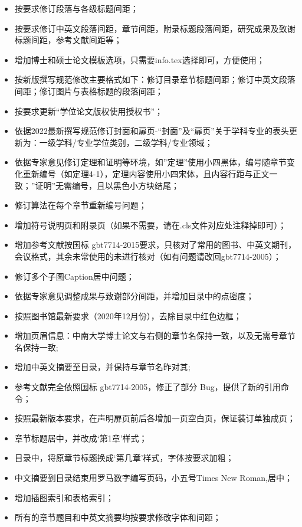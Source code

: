 \begin{itemize}
\item 按要求修订段落与各级标题间距；
\item 按要求修订中英文段落间距，章节间距，附录标题段落间距，研究成果及致谢标题间距，参考文献间距等；
\item 增加博士和硕士论文模板选项，只需要info.tex选择即可，方便使用；
\item 按新版撰写规范修改主要格式如下：修订目录章节标题间距；修订中英文段落间距；修订图片与表格标题的段落间距；
\item 按要求更新“学位论文版权使用授权书”；
\item 依据2022最新撰写规范修订封面和扉页-“封面”及“扉页”关于学科专业的表头更新为：一级学科/专业学位类别，二级学科/专业领域；
\item 依据专家意见修订定理和证明等环境，如”定理”使用小四黑体，编号随章节变化重新编号（如定理4-1），定理内容使用小四宋体，且内容行距与正文一致；”证明”无需编号，且以黑色小方块结尾；
\item 修订算法在每个章节重新编号问题；
\item 增加符号说明页和附录页（如果不需要，请在.cls文件对应处注释掉即可）；
\item  增加参考文献按国标 gbt7714-2015要求，只核对了常用的图书、中英文期刊，会议格式，其余未常使用的未进行核对（如有问题请改回gbt7714-2005）；
\item  修订多个子图Caption居中问题；
\item 依据专家意见调整成果与致谢部分间距，并增加目录中的点密度；
\item 按照图书馆最新要求（2020年12月份），去除目录中红色边框；
\item 增加页眉信息：中南大学博士论文与右侧的章节名保持一致，以及无需号章节名保持一致;
\item 增加中英文摘要至目录，并保持与章节名昨对其;
\item 参考文献完全依照国标 gbt7714-2005，修正了部分 Bug，提供了新的引用命令；
\item 按照最新版本要求，在声明扉页前后各增加一页空白页，保证装订单独成页；
\item 章节标题居中，并改成‘第1章’样式；
\item 目录中，将原章节标题换成‘第几章’样式，字体按要求加粗；
\item 中文摘要到目录结束用罗马数字编写页码，小五号Times New Roman,居中；
\item 增加插图索引和表格索引；
\item 所有的章节题目和中英文摘要均按要求修改字体和间距；
\end{itemize}

